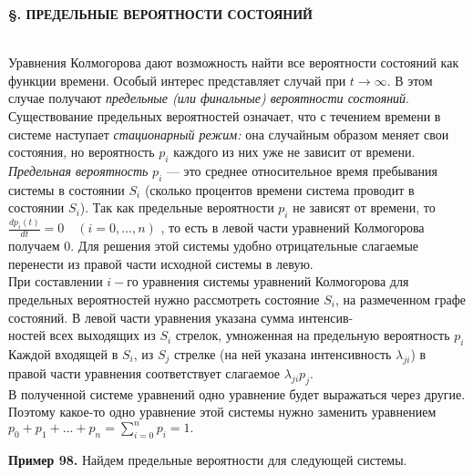 \documentclass{article}
\begin{document}
\begin{center}
\textbf{\S {}.  ПРЕДЕЛЬНЫЕ  ВЕРОЯТНОСТИ  СОСТОЯНИЙ}\end{center}
 \\ 

\indent Уравнения Колмогорова дают возможность найти все вероятности состояний  как функции  времени.  Особый  интерес  представляет случай  при $t \to \infty $.  В этом случае получают \textit{предельные  (или  финальные) вероятности состояний}. Существование предельных вероятностей означает, что с течением времени в системе наступает \textit{стационарный режим:} она случайным образом меняет свои состояния, но вероятность $p_i$ каждого из них уже не зависит от времени. \\ 
\indent \textit{Предельная  вероятность} $p_i$ — это среднее относительное время пребывания системы в состоянии $S_i$ (сколько процентов времени система проводит в состоянии $S_i$).  
 Так  как предельные  вероятности $p_i$  не  зависят от времени, то  $\frac{d p_i(t)}{dt} = 0 \quad (i = 0, \ldots, n)$ 
, то есть в левой части уравнений Колмогорова получаем 0. Для решения этой системы удобно отрицательные слагаемые перенести из правой части исходной системы в левую. \\ \indent
При составлении $i-$го  уравнения системы уравнений Колмогорова для предельных вероятностей нужно рассмотреть состояние $S_i$, на размеченном графе состояний. В левой части уравнения указана сумма интенсив- \\ ностей всех выходящих из $S_i$ стрелок, умноженная на предельную вероятность $p_i$ Каждой входящей в $S_i$, из $S_j$ стрелке (на ней указана интенсивность $\lambda_{ji}$) в правой части уравнения соответствует слагаемое $\lambda_{ji}p_j$.  \\ В полученной системе уравнений одно уравнение будет выражаться через другие. \\ \indent
Поэтому какое-то одно уравнение этой системы нужно заменить уравнением
$p_0 + p_1 + ... + p_n = \sum\limits_{i=0}^{n} p_i = 1.$

\indent \; \; \; \textbf{Пример  98.} Найдем предельные вероятности для следующей системы.
\end{document}
